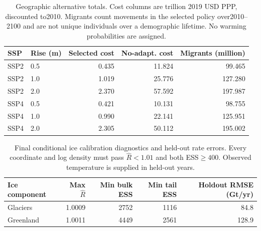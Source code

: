 \begin{table}[htbp]
\centering\small
\begin{tabular}{llrrr}
\toprule
SSP & Rise (m) & Selected cost & No-adapt. cost & Migrants (million) \\
\midrule
SSP2 & 0.5 & 0.435 & 11.824 & 99.465 \\
SSP2 & 1.0 & 1.019 & 25.776 & 127.280 \\
SSP2 & 2.0 & 2.370 & 57.592 & 197.987 \\
SSP4 & 0.5 & 0.421 & 10.131 & 98.755 \\
SSP4 & 1.0 & 0.990 & 22.141 & 125.951 \\
SSP4 & 2.0 & 2.305 & 50.112 & 195.002 \\
\bottomrule\end{tabular}
\caption{Geographic alternative totals. Cost columns are trillion 2019 USD PPP, discounted to2010. Migrants count movements in the selected policy over2010--2100 and are not unique individuals over a demographic lifetime. No warming probabilities are assigned.}
\end{table}
\begin{table}[htbp]
\centering\small
\begin{tabular}{lrrrr}
\toprule
Ice component & Max $\widehat R$ & Min bulk ESS & Min tail ESS & Holdout RMSE (Gt/yr) \\
\midrule
Glaciers & 1.0009 & 2752 & 1116 & 84.8 \\
Greenland & 1.0011 & 4449 & 2561 & 128.9 \\
\bottomrule\end{tabular}
\caption{Final conditional ice calibration diagnostics and held-out rate errors. Every coordinate and log density must pass $\widehat R<1.01$ and both ESS$\ge400$. Observed temperature is supplied in held-out years.}
\end{table}
